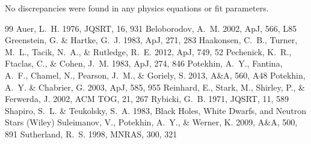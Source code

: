 \documentclass[11pt,a4paper]{article}
\begin{document}
No discrepancies were found in any physics equations or fit parameters.


\begin{thebibliography}{99}
 Auer, L.~H. 1976, JQSRT, 16, 931
 Beloborodov, A.~M. 2002, ApJ, 566, L85
 Greenstein, G. \& Hartke, G.~J. 1983, ApJ, 271, 283
 Haakonsen, C.~B., Turner, M.~L., Tacik, N.~A., \& Rutledge, R.~E. 2012, ApJ, 749, 52
 Pechenick, K.~R., Ftaclas, C., \& Cohen, J.~M. 1983, ApJ, 274, 846
 Potekhin, A.~Y., Fantina, A.~F., Chamel, N., Pearson, J.~M., \& Goriely, S. 2013, A\&A, 560, A48
 Potekhin, A.~Y. \& Chabrier, G. 2003, ApJ, 585, 955
 Reinhard, E., Stark, M., Shirley, P., \& Ferwerda, J. 2002, ACM TOG, 21, 267
 Rybicki, G.~B. 1971, JQSRT, 11, 589
 Shapiro, S.~L. \& Teukolsky, S.~A. 1983, Black Holes, White Dwarfs, and Neutron Stars (Wiley)
 Suleimanov, V., Potekhin, A.~Y., \& Werner, K. 2009, A\&A, 500, 891
 Sutherland, R.~S. 1998, MNRAS, 300, 321
\end{thebibliography}
\end{document}
